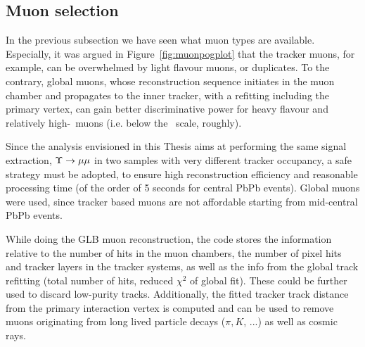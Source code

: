 \subsection{Muon selection}
\label{sec:muonID}

In the previous subsection we have seen what muon types are
available. Especially, it was argued in Figure~\ref{fig:muonpogplot}
that the tracker muons, for example, can be overwhelmed by light
flavour muons, or duplicates. To the contrary, global muons, whose
reconstruction sequence initiates in the muon chamber and propagates
to the inner tracker, with a refitting including the primary vertex,
can gain better discriminative power for heavy flavour and relatively
high-\pt\ muons (i.e. below the \TeV\ scale, roughly). 


Since the analysis envisioned in this Thesis aims at performing the
same signal extraction, $\Upsilon \to \mu\mu$ in two samples with very
different tracker occupancy, a safe strategy must be adopted, to
ensure high reconstruction efficiency and reasonable processing time
(of the order of 5 seconds for central PbPb events). Global muons were
used, since tracker based muons are not affordable starting from
mid-central PbPb events.


While doing the GLB muon reconstruction, the code stores the
information relative to the number of hits in the muon chambers, the
number of pixel hits and tracker layers in
the tracker systems, as well as the info from the global track
refitting (total number of hits, reduced $\chi^{2}$ of global
fit). These could be further used to discard low-purity
tracks. Additionally, the fitted tracker track distance from the
primary interaction vertex is computed and can be used to remove muons
originating from long lived particle decays ($\pi, K$, ...) as well as
cosmic rays.


